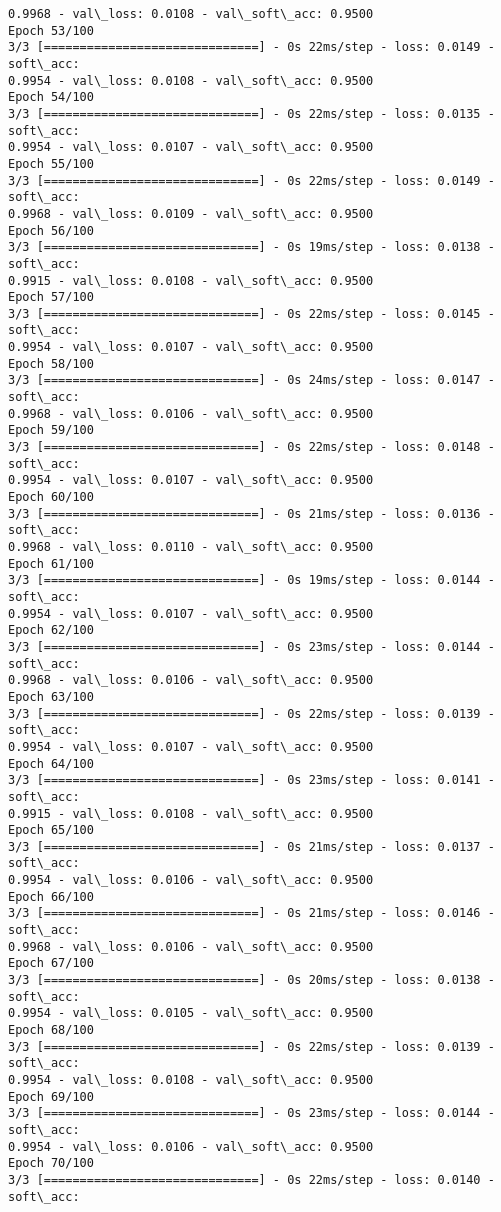 \documentclass[11pt]{article}
\begin{document}
\begin{Verbatim}[commandchars=\\\{\}]
0.9968 - val\_loss: 0.0108 - val\_soft\_acc: 0.9500
Epoch 53/100
3/3 [==============================] - 0s 22ms/step - loss: 0.0149 - soft\_acc:
0.9954 - val\_loss: 0.0108 - val\_soft\_acc: 0.9500
Epoch 54/100
3/3 [==============================] - 0s 22ms/step - loss: 0.0135 - soft\_acc:
0.9954 - val\_loss: 0.0107 - val\_soft\_acc: 0.9500
Epoch 55/100
3/3 [==============================] - 0s 22ms/step - loss: 0.0149 - soft\_acc:
0.9968 - val\_loss: 0.0109 - val\_soft\_acc: 0.9500
Epoch 56/100
3/3 [==============================] - 0s 19ms/step - loss: 0.0138 - soft\_acc:
0.9915 - val\_loss: 0.0108 - val\_soft\_acc: 0.9500
Epoch 57/100
3/3 [==============================] - 0s 22ms/step - loss: 0.0145 - soft\_acc:
0.9954 - val\_loss: 0.0107 - val\_soft\_acc: 0.9500
Epoch 58/100
3/3 [==============================] - 0s 24ms/step - loss: 0.0147 - soft\_acc:
0.9968 - val\_loss: 0.0106 - val\_soft\_acc: 0.9500
Epoch 59/100
3/3 [==============================] - 0s 22ms/step - loss: 0.0148 - soft\_acc:
0.9954 - val\_loss: 0.0107 - val\_soft\_acc: 0.9500
Epoch 60/100
3/3 [==============================] - 0s 21ms/step - loss: 0.0136 - soft\_acc:
0.9968 - val\_loss: 0.0110 - val\_soft\_acc: 0.9500
Epoch 61/100
3/3 [==============================] - 0s 19ms/step - loss: 0.0144 - soft\_acc:
0.9954 - val\_loss: 0.0107 - val\_soft\_acc: 0.9500
Epoch 62/100
3/3 [==============================] - 0s 23ms/step - loss: 0.0144 - soft\_acc:
0.9968 - val\_loss: 0.0106 - val\_soft\_acc: 0.9500
Epoch 63/100
3/3 [==============================] - 0s 22ms/step - loss: 0.0139 - soft\_acc:
0.9954 - val\_loss: 0.0107 - val\_soft\_acc: 0.9500
Epoch 64/100
3/3 [==============================] - 0s 23ms/step - loss: 0.0141 - soft\_acc:
0.9915 - val\_loss: 0.0108 - val\_soft\_acc: 0.9500
Epoch 65/100
3/3 [==============================] - 0s 21ms/step - loss: 0.0137 - soft\_acc:
0.9954 - val\_loss: 0.0106 - val\_soft\_acc: 0.9500
Epoch 66/100
3/3 [==============================] - 0s 21ms/step - loss: 0.0146 - soft\_acc:
0.9968 - val\_loss: 0.0106 - val\_soft\_acc: 0.9500
Epoch 67/100
3/3 [==============================] - 0s 20ms/step - loss: 0.0138 - soft\_acc:
0.9954 - val\_loss: 0.0105 - val\_soft\_acc: 0.9500
Epoch 68/100
3/3 [==============================] - 0s 22ms/step - loss: 0.0139 - soft\_acc:
0.9954 - val\_loss: 0.0108 - val\_soft\_acc: 0.9500
Epoch 69/100
3/3 [==============================] - 0s 23ms/step - loss: 0.0144 - soft\_acc:
0.9954 - val\_loss: 0.0106 - val\_soft\_acc: 0.9500
Epoch 70/100
3/3 [==============================] - 0s 22ms/step - loss: 0.0140 - soft\_acc:

\end{Verbatim}
\end{document}

